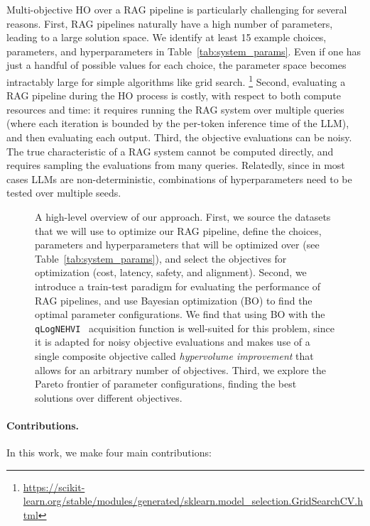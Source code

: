 Multi-objective HO over a RAG pipeline is particularly challenging for several reasons. First, RAG pipelines naturally have a high number of parameters, leading to a large solution space. We identify at least 15 example choices, parameters, and hyperparameters in Table~\ref{tab:system_params}. Even if one has just a handful of possible values for each choice, the parameter space becomes intractably large for simple algorithms like grid search.
\footnote{\url{https://scikit-learn.org/stable/modules/generated/sklearn.model_selection.GridSearchCV.html}} Second, evaluating a RAG pipeline during the HO process is costly, with respect to both compute resources and time: it requires running the RAG system over multiple queries (where each iteration is bounded by the per-token inference time of the LLM), and then evaluating each output. Third, the objective evaluations can be noisy. The true characteristic of a RAG system cannot be computed directly, and requires sampling the evaluations from many queries. Relatedly, since in most cases LLMs are non-deterministic, combinations of hyperparameters need to be tested over multiple seeds.

\begin{figure}[t]
    \centering  
    \caption{A high-level overview of our approach. First, we source the datasets that we will use to optimize our RAG pipeline, define the choices, parameters and hyperparameters that will be optimized over (see Table~\ref{tab:system_params}), and select the objectives for optimization (\eg cost, latency, safety, and alignment). 
    Second, we introduce a train-test paradigm for evaluating the performance of RAG pipelines, and use Bayesian optimization (BO) to find the optimal parameter configurations. We find that using BO with the \texttt{qLogNEHVI}~\citep{daulton2021parallel, ament2023unexpected} acquisition function is well-suited for this problem, since it is adapted for noisy objective evaluations and makes use of a single composite objective called \emph{hypervolume improvement} that allows for an arbitrary number of objectives. Third, we explore the Pareto frontier of parameter configurations, finding the best solutions over different objectives.}
    \label{fig:enter-label}
\end{figure}

\paragraph{Contributions.} In this work, we make four main contributions:

